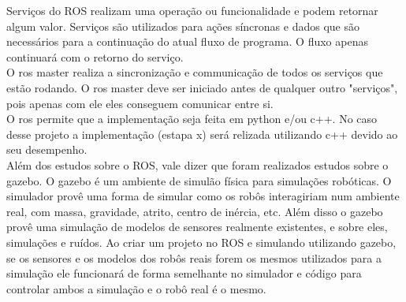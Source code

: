 \documentclass{article}
\begin{document}
	Serviços do ROS realizam uma operação ou funcionalidade e podem retornar algum valor. Serviços são utilizados para ações síncronas e dados que são necessários para a continuação do atual fluxo de programa. O fluxo apenas continuará com o retorno do serviço.\\

	O ros master realiza a sincronização e communicação de todos os serviços que estão rodando. O ros master deve ser iniciado antes de qualquer outro "serviços", pois apenas com ele eles conseguem comunicar entre si.\\
O ros permite que a implementação seja feita em python e/ou c++. No caso desse projeto a implementação (estapa x) será relizada utilizando c++ devido ao seu desempenho.\\

Além dos estudos sobre o ROS, vale dizer que foram realizados estudos sobre o gazebo. O gazebo é um ambiente de simulão física para simulações robóticas. O simulador provê uma forma de simular como os robôs interagiriam num ambiente real, com massa, gravidade, atrito, centro de inércia, etc. Além disso o gazebo provê uma simulação de modelos de sensores realmente existentes, e sobre eles, simulações e ruídos. Ao criar um projeto no ROS e simulando utilizando gazebo, se os sensores e os modelos dos robôs reais forem os mesmos utilizados para a simulação ele funcionará de forma semelhante no simulador e código para controlar ambos a simulação e o robô real é o mesmo.\\
\end{document}
